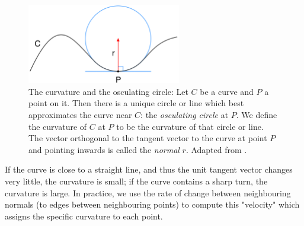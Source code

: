 \begin{figure}[H]
	\centering
	\includegraphics[width=0.6\textwidth]{../Figures/curveCircle.png}
	\caption{The curvature and the osculating circle: Let \( C \) be a curve and \( P \) a point on it. Then there is a unique circle or line which best approximates the curve near \( C \): the \textit{osculating circle} at \( P \). We define the curvature of \( C \) at \( P \) to be the curvature of that circle or line. The vector orthogonal to the tangent vector to the curve at point \( P \) and pointing inwards is called the \textit{normal} \(r\). Adapted from \cite{osculatingCircle}.
		}
	\label{fig:curveCircle}
\end{figure}

If the curve is close to a straight line, and thus the unit tangent vector changes very little, the curvature is small; if the curve contains a sharp turn, the curvature is large.
In practice, we use the rate of change between neighbouring normals (to edges between neighbouring points) to compute this "velocity" which assigns the specific curvature to each point.





